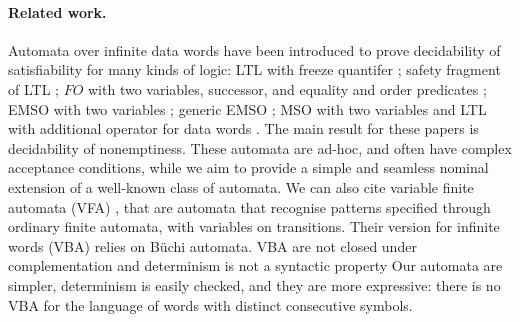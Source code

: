 \paragraph{Related work.}	
Automata over infinite data words have been introduced to prove decidability of satisfiability for many kinds of logic: LTL with freeze quantifer \cite{DemriL09}; safety fragment of LTL \cite{Lazic11}; $FO$ with two variables, successor, and equality and order predicates \cite{BojanczykDMSS11}; EMSO with two variables \cite{KaraST12}; generic EMSO \cite{Bollig11}; MSO with two variables and LTL with additional operator for data words \cite{KaraT10}. The main result for these papers is decidability of nonemptiness. These automata are ad-hoc, and often have complex acceptance conditions, while we aim to provide a simple and seamless nominal extension of a well-known class of automata. We can also cite variable finite automata (VFA) \cite{GrumbergKS10}, that are automata that recognise patterns specified through ordinary finite automata, with variables on transitions. Their version for infinite words (VBA) relies on B\"uchi automata. VBA are not closed under complementation and determinism is not a syntactic property
Our automata are simpler, determinism is easily checked, and they are more expressive: there is no VBA for the language of words with distinct consecutive symbols.

